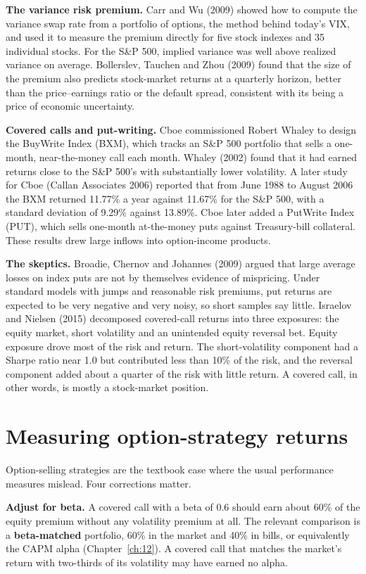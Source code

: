 \textbf{The variance risk premium.} Carr and Wu (2009) showed how to compute the variance swap rate from a portfolio of options, the method behind today's VIX, and used it to measure the premium directly for five stock indexes and 35 individual stocks. For the S\&P 500, implied variance was well above realized variance on average. Bollerslev, Tauchen and Zhou (2009) found that the size of the premium also predicts stock-market returns at a quarterly horizon, better than the price--earnings ratio or the default spread, consistent with its being a price of economic uncertainty.

\textbf{Covered calls and put-writing.} Cboe commissioned Robert Whaley to design the BuyWrite Index (BXM), which tracks an S\&P 500 portfolio that sells a one-month, near-the-money call each month. Whaley (2002) found that it had earned returns close to the S\&P 500's with substantially lower volatility. A later study for Cboe (Callan Associates 2006) reported that from June 1988 to August 2006 the BXM returned 11.77\% a year against 11.67\% for the S\&P 500, with a standard deviation of 9.29\% against 13.89\%. Cboe later added a PutWrite Index (PUT), which sells one-month at-the-money puts against Treasury-bill collateral. These results drew large inflows into option-income products.

\textbf{The skeptics.} Broadie, Chernov and Johannes (2009) argued that large average losses on index puts are not by themselves evidence of mispricing. Under standard models with jumps and reasonable risk premiums, put returns are expected to be very negative and very noisy, so short samples say little. Israelov and Nielsen (2015) decomposed covered-call returns into three exposures: the equity market, short volatility and an unintended equity reversal bet. Equity exposure drove most of the risk and return. The short-volatility component had a Sharpe ratio near 1.0 but contributed less than 10\% of the risk, and the reversal component added about a quarter of the risk with little return. A covered call, in other words, is mostly a stock-market position.

\section{Measuring option-strategy returns}
\label{sec:14-measure}

Option-selling strategies are the textbook case where the usual performance measures mislead. Four corrections matter.

\textbf{Adjust for beta.} A covered call with a beta of 0.6 should earn about 60\% of the equity premium without any volatility premium at all. The relevant comparison is a \textbf{beta-matched} portfolio, 60\% in the market and 40\% in bills, or equivalently the CAPM alpha (Chapter~\ref{ch:12}). A covered call that matches the market's return with two-thirds of its volatility may have earned no alpha.

